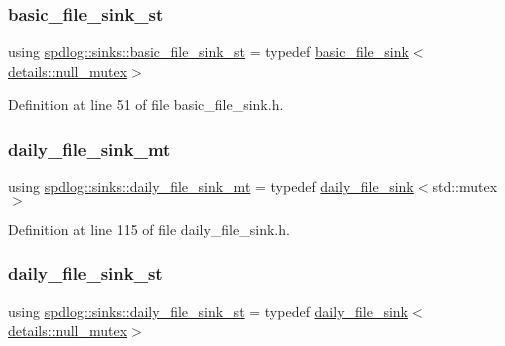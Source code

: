 \subsubsection{\texorpdfstring{basic\+\_\+file\+\_\+sink\+\_\+st}{basic\_file\_sink\_st}}
{\footnotesize\ttfamily using \hyperlink{namespacespdlog_1_1sinks_ab6d38313481cd7fedfb8aeb68c2c61d1}{spdlog\+::sinks\+::basic\+\_\+file\+\_\+sink\+\_\+st} = typedef \hyperlink{classspdlog_1_1sinks_1_1basic__file__sink}{basic\+\_\+file\+\_\+sink}$<$\hyperlink{structspdlog_1_1details_1_1null__mutex}{details\+::null\+\_\+mutex}$>$}



Definition at line 51 of file basic\+\_\+file\+\_\+sink.\+h.

\mbox{\label{namespacespdlog_1_1sinks_a61124c3792c83b90aad230770f627525}} 
\subsubsection{\texorpdfstring{daily\+\_\+file\+\_\+sink\+\_\+mt}{daily\_file\_sink\_mt}}
{\footnotesize\ttfamily using \hyperlink{namespacespdlog_1_1sinks_a61124c3792c83b90aad230770f627525}{spdlog\+::sinks\+::daily\+\_\+file\+\_\+sink\+\_\+mt} = typedef \hyperlink{classspdlog_1_1sinks_1_1daily__file__sink}{daily\+\_\+file\+\_\+sink}$<$std\+::mutex$>$}



Definition at line 115 of file daily\+\_\+file\+\_\+sink.\+h.

\mbox{\label{namespacespdlog_1_1sinks_a1f1c8468d4251073ce96194a5db1fb9e}} 
\subsubsection{\texorpdfstring{daily\+\_\+file\+\_\+sink\+\_\+st}{daily\_file\_sink\_st}}
{\footnotesize\ttfamily using \hyperlink{namespacespdlog_1_1sinks_a1f1c8468d4251073ce96194a5db1fb9e}{spdlog\+::sinks\+::daily\+\_\+file\+\_\+sink\+\_\+st} = typedef \hyperlink{classspdlog_1_1sinks_1_1daily__file__sink}{daily\+\_\+file\+\_\+sink}$<$\hyperlink{structspdlog_1_1details_1_1null__mutex}{details\+::null\+\_\+mutex}$>$}



